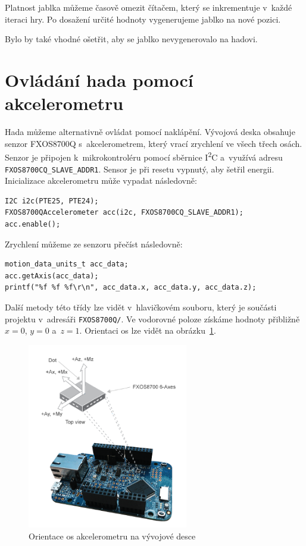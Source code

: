 \documentclass[12pt]{article}
\newcommand{\twi}{I\textsuperscript{2}C}
\begin{document}
Platnost jablka můžeme časově omezit čítačem, který se inkrementuje v~každé iteraci hry.
Po dosažení určité hodnoty vygenerujeme jablko na nové pozici.

Bylo by také vhodné ošetřit, aby se jablko nevygenerovalo na hadovi.

\section{Ovládání hada pomocí akcelerometru}
Hada můžeme alternativně ovládat pomocí naklápění.
Vývojová deska obsahuje senzor FXOS8700Q s~akcelerometrem, který vrací zrychlení ve všech třech osách.
Senzor je připojen k~mikrokontroléru pomocí sběrnice \twi{} a~využívá adresu \texttt{FXOS8700CQ\_SLAVE\_ADDR1}.
Sensor je při resetu vypnutý, aby šetřil energii.
Inicializace akcelerometru může vypadat následovně:
\begin{verbatim}
I2C i2c(PTE25, PTE24);
FXOS8700QAccelerometer acc(i2c, FXOS8700CQ_SLAVE_ADDR1);
acc.enable();
\end{verbatim}

Zrychlení můžeme ze senzoru přečíst následovně:
\begin{verbatim}
motion_data_units_t acc_data;
acc.getAxis(acc_data);
printf("%f %f %f\r\n", acc_data.x, acc_data.y, acc_data.z);
\end{verbatim}
Další metody této třídy lze vidět v~hlavičkovém souboru, který je součásti projektu v~adresáři \texttt{FXOS8700Q/}.
Ve vodorovné poloze získáme hodnoty přibližně $ x = 0$, $y = 0$ a~$z = 1 $.
Orientaci os lze vidět na obrázku~\ref{fig:axes}.

\begin{figure}[ht]
  \centering
  \includegraphics[width=7cm]{figures/axis}
  \caption[]{Orientace os akcelerometru na vývojové desce\footnotemark}
  \label{fig:axes}
\end{figure}
\end{document}
